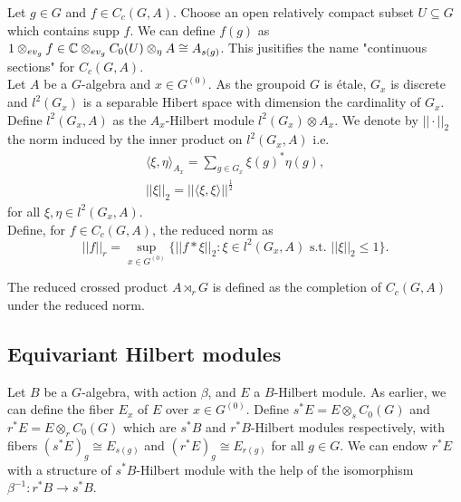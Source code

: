 
Let $g\in G$ and $f\in C_c(G,A)$. Choose an open relatively compact subset $U\subseteq G$ which contains supp $f$. We can define $f(g)$ as $1\otimes_{ev_g} f \in \mathbb C \otimes_{ev_g} C_0(U)\otimes_\eta A\cong A_{s(g)}$. This jusitifies the name "continuous sections" for $C_c(G,A)$. \\

Let $A$ be a $G$-algebra and $x\in G^{(0)}$. As the groupoid $G$ is étale, $G_x$ is discrete and $l^2(G_x)$ is a separable Hibert space with dimension the cardinality of $G_x$. Define $l^2(G_x,A)$ as the $A_x$-Hilbert module $l^2(G_x)\otimes A_x$. We denote by $||\cdot||_2$ the norm induced by the inner product on $l^2(G_x,A)$ i.e. 
\[ \begin{array}{c}
\langle \xi,\eta\rangle_{A_x}= \sum_{g\in G_x} \xi(g)^* \eta(g),\\
||\xi||_2= ||\langle \xi,\xi \rangle||^\frac{1}{2} 
\end{array}\] 
for all $\xi,\eta\in l^2(G_x,A)$.\\

Define, for $f\in C_c(G,A)$, the reduced norm as 
\[||f||_r= \sup_{x\in G^{(0)}}\{ ||f\ast \xi||_2 : \xi\in l^2(G_x,A) \text{ s.t. } ||\xi||_2\leq 1\}.\]


\begin{definition}
The reduced crossed product $A\rtimes_r G$ is defined as the completion of $C_c(G,A)$ under the reduced norm.
\end{definition}


\subsection{Equivariant Hilbert modules}
Let $B$ be a $G$-algebra, with action $\beta$, and $E$ a $B$-Hilbert module. As earlier, we can define the fiber $E_x$ of $E$ over $x\in G^{(0)}$. Define $s^* E = E \otimes_s C_0(G)$ and $r^* E = E \otimes_r C_0(G)$ which are $s^*B$ and $r^*B$-Hilbert modules respectively, with fibers $(s^* E)_g \cong E_{s(g)}$ and $(r^* E)_g \cong E_{r(g)}$ for all $g\in G$. We can endow $r^*E$ with a structure of $s^* B$-Hilbert module with the help of the isomorphism $\beta^{-1} : r^* B\rightarrow s^* B$.

